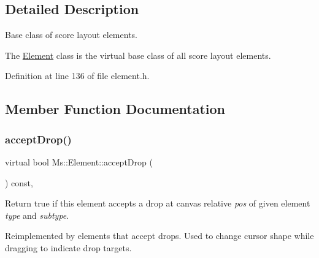 \subsection{Detailed Description}
Base class of score layout elements. 

The \hyperlink{class_ms_1_1_element}{Element} class is the virtual base class of all score layout elements. 

Definition at line 136 of file element.\+h.



\subsection{Member Function Documentation}
\mbox{\label{class_ms_1_1_element_a35614445f0bc2212cbcc75c3f5810543}} 
\subsubsection{\texorpdfstring{accept\+Drop()}{acceptDrop()}}
{\footnotesize\ttfamily virtual bool Ms\+::\+Element\+::accept\+Drop (\begin{DoxyParamCaption}\item[{\hyperlink{class_ms_1_1_edit_data}{Edit\+Data} \&}]{ }\end{DoxyParamCaption}) const\hspace{0.3cm}{\ttfamily [inline]}, {\ttfamily [virtual]}}

Return true if this element accepts a drop at canvas relative {\itshape pos} of given element {\itshape type} and {\itshape subtype}.

Reimplemented by elements that accept drops. Used to change cursor shape while dragging to indicate drop targets. 

